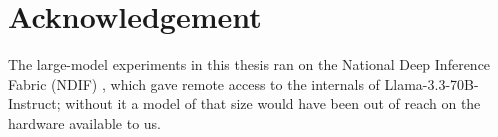 \section*{Acknowledgement}

The large-model experiments in this thesis ran on the National Deep Inference Fabric (NDIF)
\cite{fiottokaufman2024nnsight}, which gave remote access to the internals of
Llama-3.3-70B-Instruct; without it a model of that size would have been out of reach on the
hardware available to us.
